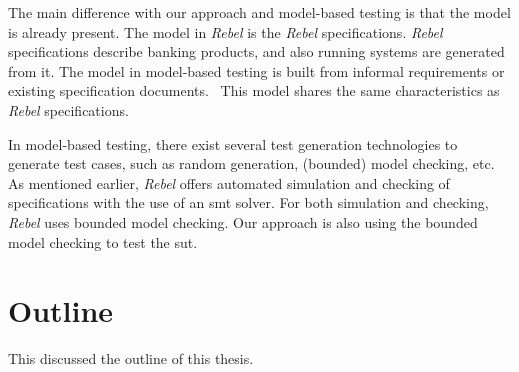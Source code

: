 The main difference with our approach and model-based testing is that the model
is already present. The model in \textit{Rebel} is the \textit{Rebel}
specifications. \textit{Rebel} specifications describe banking products, and
also running systems are generated from it. The model in model-based testing is
built from informal requirements or existing specification
documents.~\cite[p.~2]{utting2012taxonomy} This model
shares the same characteristics as \textit{Rebel} specifications.

In model-based testing, there exist several test generation technologies to
generate test cases, such as random generation, (bounded) model checking,
etc.~\cite[p.~8-9]{utting2012taxonomy}
As mentioned earlier, \textit{Rebel} offers automated simulation and checking of
specifications with the use of an \gls{smt} solver. For both simulation and
checking, \textit{Rebel} uses bounded model checking. Our approach is also using
the bounded model checking to test the \gls{sut}.


\section{Outline}
This discussed the outline of this thesis.
